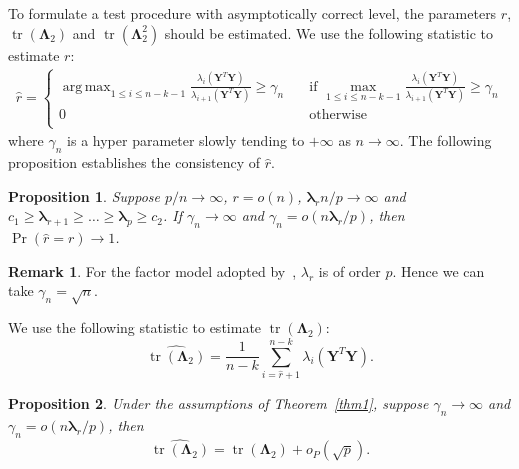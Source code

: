 \documentclass[12pt]{article} %
\DeclareMathOperator{\mytr}{tr}
\DeclareMathOperator*{\argmax}{arg\,max}
\newcommand{\bY}{\mathbf{Y}}
\newcommand{\bfsym}[1]{\ensuremath{\boldsymbol{#1}}}
\def\blambda {\bfsym {\lambda}}
\def\bLambda {\bfsym {\Lambda}}
\newtheorem{proposition}{Proposition}
\theoremstyle{definition}
\newtheorem{remark}{Remark}
\begin{document}
To formulate a test procedure with asymptotically correct level, the parameters $r$, $\mytr(\bLambda_2)$ and $\mytr(\bLambda_2^2)$ should be estimated.
We use the following statistic to estimate $r$:
    $$
    \begin{aligned}
    \hat{r}=
            \begin{cases}
                \argmax_{1\leq i\leq n-k-1} \frac{\lambda_i(\bY^T \bY)}{\lambda_{i+1}(\bY^T \bY)}\geq \gamma_n\quad& \text{if } \max_{1\leq i\leq n-k-1}\frac{\lambda_i(\bY^T \bY)}{\lambda_{i+1}(\bY^T \bY)}\geq \gamma_n\\
                0\quad&\text{otherwise}\\
            \end{cases}
    \end{aligned}
    $$
where $\gamma_n$ is a hyper parameter slowly tending to $+\infty$ as $n\to \infty$.
The following proposition establishes the consistency of $\hat{r}$.
\begin{proposition}\label{numberConsistency}
    Suppose $p/n\to \infty$, $r=o(n)$, $\blambda_r n/p\to \infty$ and $c_1\geq\blambda_{r+1}\geq \ldots \geq \blambda_p\geq c_2$. If $\gamma_n\to \infty$ and $\gamma_n = o(n\blambda_r/p)$, then
 $\Pr(\hat{r}=r)\to 1$.
\end{proposition}
\begin{remark}
    For the factor model adopted by~\cite{Ma2015A}, $\lambda_r$ is of order $p$. Hence we can take $\gamma_n=\sqrt{n}$.
\end{remark}
    We use the following statistic to estimate $\mytr(\bLambda_2)$:
    $$\widehat{\mytr(\bLambda_2)}=\frac{1}{n-k}\sum_{i=\hat{r}+1}^{n-k}\lambda_i(\bY^T \bY).$$
\begin{proposition}\label{traceProp1}
    Under the assumptions of Theorem~\ref{thm1}, suppose $\gamma_n\to \infty$ and $\gamma_n=o({n\blambda_r}/{p})$, then
    $$\widehat{\mytr(\bLambda_2)}=\mytr(\bLambda_2)+o_P(\sqrt{p}).$$
\end{proposition}
\end{document}
